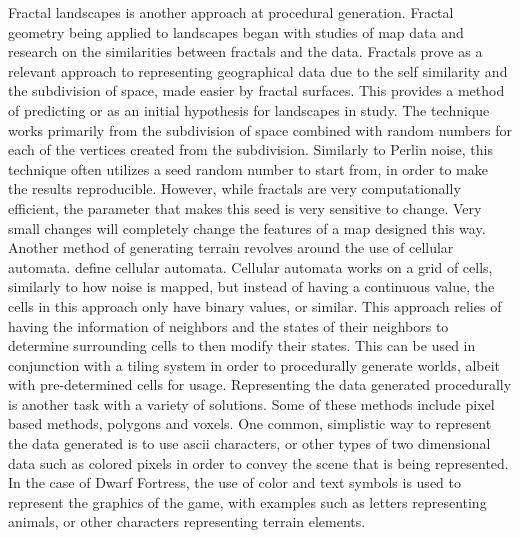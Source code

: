 \documentclass[10pt]{report}
\begin{document}
		Fractal landscapes is another approach at procedural generation. Fractal geometry being applied to landscapes began with studies of map data and research on the similarities between fractals and the data. Fractals prove as a relevant approach to representing geographical data due to the self similarity and the subdivision of space, made easier by fractal surfaces. This provides a method of predicting or as an initial hypothesis for landscapes in study. The technique works primarily from the subdivision of space combined with random numbers for each of the vertices created from the subdivision. Similarly to Perlin noise, this technique often utilizes a seed random number to start from, in order to make the results reproducible. However, while fractals are very computationally efficient, the parameter that makes this seed is very sensitive to change. Very small changes will completely change the features of a map designed this way.
		Another method of generating terrain revolves around the use of cellular automata. define cellular automata. Cellular automata works on a grid of cells, similarly to how noise is mapped, but instead of having a continuous value, the cells in this approach only have binary values, or similar. This approach relies of having the information of neighbors and the states of their neighbors to determine surrounding cells to then modify their states. This can be used in conjunction with a tiling system in order to procedurally generate worlds, albeit with pre-determined cells for usage.
		Representing the data generated procedurally is another task with a variety of solutions. Some of these methods include pixel based methods, polygons and voxels. One common, simplistic way to represent the data generated is to use ascii characters, or other types of two dimensional data such as colored pixels in order to convey the scene that is being represented. In the case of Dwarf Fortress, the use of color and text symbols is used to represent the graphics of the game, with examples such as letters representing animals, or other characters representing terrain elements. 
		
\end{document}
